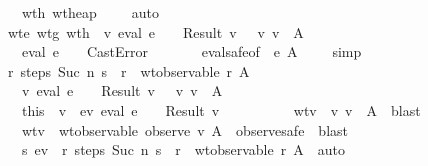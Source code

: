 \begin{isabellebody}
\ \ \ \ \ \ \ wth{\isacharcolon}\ {\isachardoublequoteopen}wt{\isacharunderscore}heap\ {\isasymSigma}\ {\isasymmu}\ {\isacharbraceleft}{\isacharbraceright}{\isachardoublequoteclose}\ \isamarkupfalse \ auto\isanewline
\ \ \ \ \isamarkupfalse \ wte\ wtg\ wth\ \isamarkupfalse \ {\isachardoublequoteopen}{\isacharparenleft}{\isasymexists}v{\isachardot}\ eval\ e\ {\isasymrho}\ {\isasymmu}\ {\isacharequal}\ Result\ v\ {\isasymand}\ {\isasymSigma}\ {\isasymturnstile}v\ v\ {\isacharcolon}\ A{\isacharparenright}\isanewline
\ \ \ \ \ \ {\isasymor}\ eval\ e\ {\isasymrho}\ {\isasymmu}\ {\isacharequal}\ CastError{\isachardoublequoteclose}\isanewline
\ \ \ \ \ \ \isamarkupfalse \ eval{\isacharunderscore}safe{\isacharbrackleft}of\ {\isasymGamma}\ e\ A\ {\isasymSigma}\ {\isasymrho}\ {\isasymmu}{\isacharbrackright}\ \isamarkupfalse \ simp\isanewline
\ \ \ \ \isamarkupfalse \ {\isachardoublequoteopen}{\isasymexists}r{\isachardot}\ steps\ {\isacharparenleft}Suc\ n{\isacharparenright}\ s\ {\isacharequal}\ r\ {\isasymand}\ wt{\isacharunderscore}observable\ r\ A{\isachardoublequoteclose}\isanewline
\ \ \ \ \isamarkupfalse \isanewline
\ \ \ \ \ \ \isamarkupfalse \ {\isachardoublequoteopen}{\isasymexists}v{\isachardot}\ eval\ e\ {\isasymrho}\ {\isasymmu}\ {\isacharequal}\ Result\ v\ {\isasymand}\ {\isasymSigma}\ {\isasymturnstile}v\ v\ {\isacharcolon}\ A{\isachardoublequoteclose}\isanewline
\ \ \ \ \ \ \isamarkupfalse \ this\ \isamarkupfalse \ v\ \ ev{\isacharcolon}\ {\isachardoublequoteopen}eval\ e\ {\isasymrho}\ {\isasymmu}\ {\isacharequal}\ Result\ v{\isachardoublequoteclose}\ \isanewline
\ \ \ \ \ \ \ \ \ wtv{\isacharcolon}\ {\isachardoublequoteopen}{\isasymSigma}\ {\isasymturnstile}v\ v\ {\isacharcolon}\ A{\isachardoublequoteclose}\ \isamarkupfalse \ blast\isanewline
\ \ \ \ \ \ \isamarkupfalse \ wtv\ \isamarkupfalse \ {\isachardoublequoteopen}wt{\isacharunderscore}observable\ {\isacharparenleft}observe\ v{\isacharparenright}\ A{\isachardoublequoteclose}\ \isamarkupfalse \ observe{\isacharunderscore}safe\ \isamarkupfalse \ blast\isanewline
\ \ \ \ \ \ \isamarkupfalse \ s\ ev\ \isamarkupfalse \ {\isachardoublequoteopen}{\isasymexists}r{\isachardot}\ steps\ {\isacharparenleft}Suc\ n{\isacharparenright}\ s\ {\isacharequal}\ r\ {\isasymand}\ wt{\isacharunderscore}observable\ r\ A{\isachardoublequoteclose}\ \isamarkupfalse \ auto\isanewline

\end{isabellebody}
